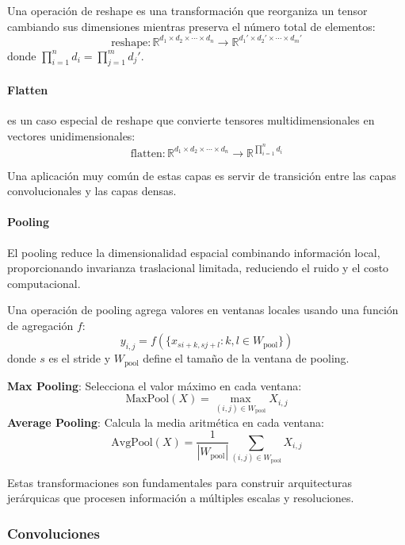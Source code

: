 \begin{definition}\label{def:reshape}
	Una operación de reshape es una transformación que reorganiza un tensor cambiando sus dimensiones mientras preserva el número total de elementos:
	\[
	\text{reshape}: \mathbb{R}^{d_1 \times d_2 \times \cdots \times d_n} \to \mathbb{R}^{d_1' \times d_2' \times \cdots \times d_m'}
	\]
	donde $\prod_{i=1}^n d_i = \prod_{j=1}^m d_j'$.
\end{definition}

\paragraph{Flatten} es un caso especial de reshape que convierte tensores multidimensionales en vectores unidimensionales:
\[
\text{flatten}: \mathbb{R}^{d_1 \times d_2 \times \cdots \times d_n} \to \mathbb{R}^{\prod_{i=1}^n d_i}
\]

Una aplicación muy común de estas capas es servir de transición entre las capas convolucionales y las capas densas.

\paragraph{Pooling}

El pooling reduce la dimensionalidad espacial combinando información local, proporcionando invarianza traslacional limitada, reduciendo el ruido y el costo computacional.

\begin{definition}\label{def:pooling}
	Una operación de pooling agrega valores en ventanas locales usando una función de agregación $f$:
	\[
	y_{i,j} = f\left(\{x_{si+k, sj+l} : k,l \in W_{\text{pool}}\}\right)
	\]
	donde $s$ es el stride y $W_{\text{pool}}$ define el tamaño de la ventana de pooling.
\end{definition}

\textbf{Max Pooling}: Selecciona el valor máximo en cada ventana:
\[
\text{MaxPool}(X) = \max_{(i,j) \in W_{\text{pool}}} X_{i,j}
\]
\textbf{Average Pooling}: Calcula la media aritmética en cada ventana:
\[
\text{AvgPool}(X) = \frac{1}{|W_{\text{pool}}|} \sum_{(i,j) \in W_{\text{pool}}} X_{i,j}
\]

Estas transformaciones son fundamentales para construir arquitecturas jerárquicas que procesen información a múltiples escalas y resoluciones.

\subsubsection{Convoluciones}

